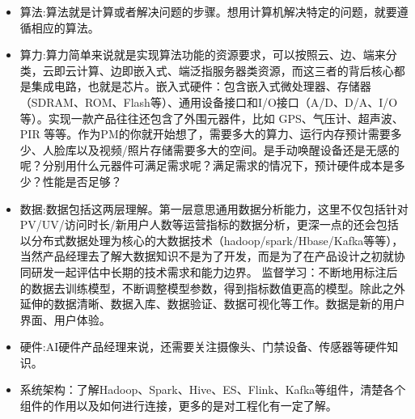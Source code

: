 \documentclass[letterpaper,10pt,english]{sphinxmanual}
\begin{document}
%
\begin{footnote}[277]\sphinxAtStartFootnote
{}
%
\end{footnote}
\begin{itemize}
\item {} 
算法:算法就是计算或者解决问题的步骤。想用计算机解决特定的问题，就要遵循相应的算法。

\item {} 
算力:算力简单来说就是实现算法功能的资源要求，可以按照云、边、端来分类，云即云计算、边即嵌入式、端泛指服务器类资源，而这三者的背后核心都是集成电路，也就是芯片。嵌入式硬件：包含嵌入式微处理器、存储器（SDRAM、ROM、Flash等）、通用设备接口和I/O接口（A/D、D/A、I/O等）。实现一款产品往往还包含了外围元器件，比如
GPS、气压计、超声波、PIR
等等。作为PM的你就开始想了，需要多大的算力、运行内存预计需要多少、人脸库以及视频/照片存储需要多大的空间。是手动唤醒设备还是无感的呢？分别用什么元器件可满足需求呢？满足需求的情况下，预计硬件成本是多少？性能是否足够？

\item {} 
数据:数据包括这两层理解。第一层意思通用数据分析能力，这里不仅包括针对PV/UV/访问时长/新用户人数等运营指标的数据分析，更深一点的还会包括以分布式数据处理为核心的大数据技术（hadoop/spark/Hbase/Kafka等等），当然产品经理去了解大数据知识不是为了开发，而是为了在产品设计之初就协同研发一起评估中长期的技术需求和能力边界。
监督学习：不断地用标注后的数据去训练模型，不断调整模型参数，得到指标数值更高的模型。除此之外延伸的数据清晰、数据入库、数据验证、数据可视化等工作。数据是新的用户界面、用户体验。%
\begin{footnote}[278]\sphinxAtStartFootnote
{}
%
\end{footnote}

\item {} 
硬件:AI硬件产品经理来说，还需要关注摄像头、门禁设备、传感器等硬件知识。

\item {} 
系统架构：了解Hadoop、Spark、Hive、ES、Flink、Kafka等组件，清楚各个组件的作用以及如何进行连接，更多的是对工程化有一定了解。%
\begin{footnote}[279]\sphinxAtStartFootnote
{}
%
\end{footnote}

\end{itemize}
\end{document}
